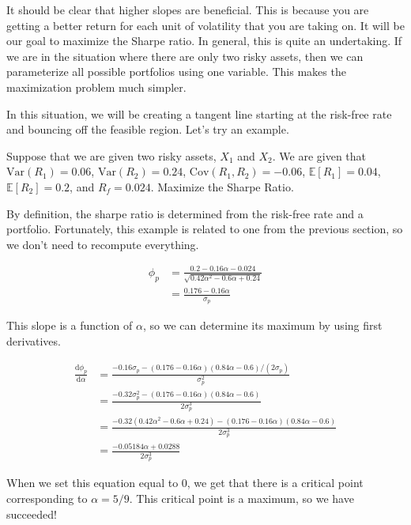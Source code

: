 \documentclass{ximera}
\begin{document}
It should be clear that higher slopes are beneficial. This is because you are getting a better return for each unit of volatility that you are taking on. It will be our goal to maximize the Sharpe ratio. In general, this is quite an undertaking. If we are in the situation where there are only two risky assets, then we can parameterize all possible portfolios using one variable. This makes the maximization problem much simpler.

In this situation, we will be creating a tangent line starting at the risk-free rate and bouncing off the feasible region. Let's try an example.

\begin{example}
Suppose that we are given two risky assets, $X_1$ and $X_2$. We are given that $\text{Var}(R_1)=0.06$, $\text{Var}(R_2)=0.24$, $\text{Cov}(R_1, R_2)=-0.06$, $\mathbb{E}[R_1]=0.04$, $\mathbb{E}[R_2]=0.2$, and $R_f=0.024$. Maximize the Sharpe Ratio.
\end{example}

\begin{solution}
By definition, the sharpe ratio is determined from the risk-free rate and a portfolio. Fortunately, this example is related to one from the previous section, so we don't need to recompute everything.

\begin{align*}
\phi_p 	&=\frac{0.2-0.16\alpha-0.024}{\sqrt{0.42\alpha^2-0.6\alpha+0.24}}\\
		&=\frac{0.176-0.16\alpha}{\sigma_p}
\end{align*}

This slope is a function of $\alpha$, so we can determine its maximum by using first derivatives.

\begin{align*}
\frac{\mathrm{d}\phi_p}{\mathrm{d}\alpha} 	&=\frac{-0.16\sigma_p-(0.176-0.16\alpha)(0.84\alpha-0.6)/(2\sigma_p)}{\sigma_p^2}\\
							&=\frac{-0.32\sigma_p^2-(0.176-0.16\alpha)(0.84\alpha-0.6)}{2\sigma_p^3}\\
							&=\frac{-0.32(0.42\alpha^2-0.6\alpha+0.24)-(0.176-0.16\alpha)(0.84\alpha-0.6)}{2\sigma_p^3}\\
							&=\frac{-0.05184\alpha+0.0288}{2\sigma_p^3}
\end{align*}

When we set this equation equal to $0$, we get that there is a critical point corresponding to $\alpha=5/9$. This critical point is a maximum, so we have succeeded!
\end{solution}
\end{document}
